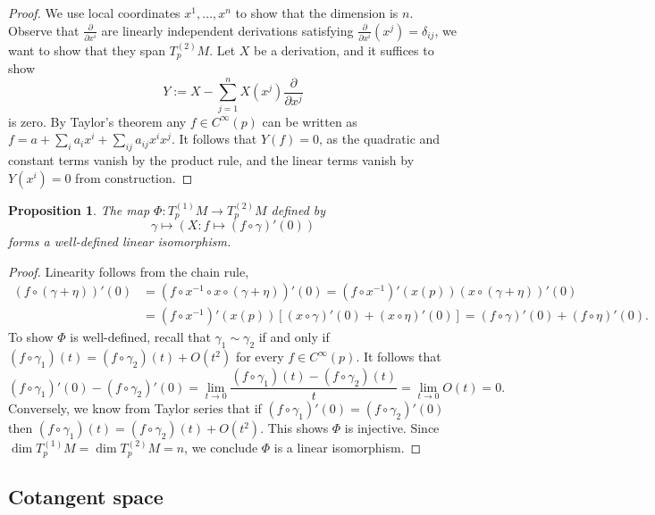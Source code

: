 \documentclass[reqno]{amsart}
\newtheorem{proposition}[theorem]{Proposition}
\theoremstyle{definition}
\theoremstyle{remark}
\begin{document}
	\begin{proof}
	We use local coordinates $x^1, \dots, x^n$ to show that the dimension is $n$. Observe that $\tfrac{\partial}{\partial x^i}$ are linearly independent derivations satisfying $\tfrac{\partial}{\partial x^i} (x^j) = \delta_{ij}$, we want to show that they span $T^{(2)}_p M$. Let $X$ be a derivation, and it suffices to show
		\[ Y := X - \sum_{j = 1}^n X(x^j) \frac{\partial}{\partial x^j} \]
	is zero. By Taylor's theorem any $f \in C^\infty (p)$ can be written as $f = a + \sum_i a_i x^i + \sum_{ij} a_{ij} x^i x^j$. It follows that $Y(f) = 0$, as the quadratic and constant terms vanish by the product rule,  and the linear terms vanish by $Y(x^i) = 0$ from construction. 
	\end{proof}
	
	\begin{proposition}
		The map $\Phi: T^{(1)}_p M \to T^{(2)}_p M$ defined by 
			\[ \gamma \mapsto (X : f \mapsto (f \circ \gamma)' (0)) \]
		forms a well-defined linear isomorphism. 
	\end{proposition}

	\begin{proof}
	Linearity follows from the chain rule, 
		\begin{align*}
			(f \circ (\gamma + \eta))' (0) 
				&= (f \circ x^{-1} \circ x \circ (\gamma + \eta))' (0) = (f \circ x^{-1})' (x(p)) (x \circ (\gamma + \eta))' (0) \\
				&= (f \circ x^{-1})'(x(p)) \left[ (x \circ \gamma)' (0) + (x \circ \eta)' (0) \right] = (f \circ \gamma)'(0) + (f \circ \eta)' (0).
		\end{align*}	
	To show $\Phi$ is well-defined, recall that $\gamma_1 \sim \gamma_2$ if and only if $(f \circ \gamma_1) (t) =  (f \circ \gamma_2 )(t) + O(t^2)$ for every $f \in C^\infty (p)$. It follows that
		\[ (f \circ \gamma_1)' (0) - (f \circ \gamma_2)' (0) =  \lim_{t \to 0} \frac{(f \circ \gamma_1)(t) - (f \circ \gamma_2) (t)}{t} = \lim_{t \to 0} O(t) = 0.\]
	Conversely, we know from Taylor series that if $(f \circ \gamma_1)'(0) = (f \circ \gamma_2)'(0)$ then $(f \circ \gamma_1) (t) = (f \circ \gamma_2) (t) + O(t^2)$. This shows $\Phi$ is injective. Since $\dim T_p^{(1)} M = \dim T_p^{(2)} M = n$, we conclude $\Phi$ is a linear isomorphism. 
	\end{proof}
	
	
	\subsection{Cotangent space}
	
\end{document}
